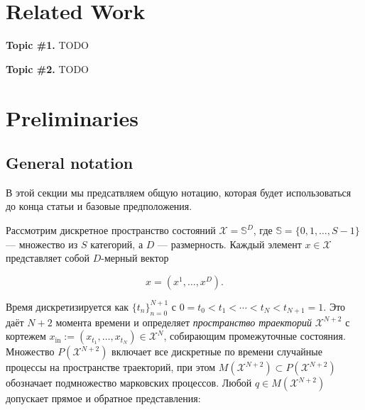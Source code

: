 \documentclass{article}
\begin{document}


\section{Related Work}\label{sec:rw}

\textbf{Topic \#1.}
TODO

\textbf{Topic \#2.}
TODO

\section{Preliminaries}\label{sec:prelim}


\subsection{General notation}

В этой секции мы предсатвляем общую нотацию, которая будет использоваться до конца статьи и базовые предположения.

Рассмотрим дискретное пространство состояний \(\mathcal{X} = \mathbb{S}^D\), где \(\mathbb{S} = \{0, 1, \ldots, S - 1\}\) — множество из \(S\) категорий, а \(D\) — размерность. Каждый элемент \(x \in \mathcal{X}\) представляет собой \(D\)-мерный вектор

\[
x = (x^1, \ldots, x^D).
\]

Время дискретизируется как \(\{t_n\}_{n=0}^{N+1}\) с \(0 = t_0 < t_1 < \cdots < t_N < t_{N+1} = 1\). Это даёт \(N+2\) момента времени и определяет \textit{пространство траекторий} \(\mathcal{X}^{N+2}\) с кортежем \(x_{\text{in}} := (x_{t_1}, \ldots, x_{t_N}) \in \mathcal{X}^N\), собирающим промежуточные состояния. Множество \(P(\mathcal{X}^{N+2})\) включает все дискретные по времени случайные процессы на пространстве траекторий, при этом \(M(\mathcal{X}^{N+2}) \subset P(\mathcal{X}^{N+2})\) обозначает подмножество марковских процессов. Любой \(q \in M(\mathcal{X}^{N+2})\) допускает прямое и обратное представления:
\end{document}

